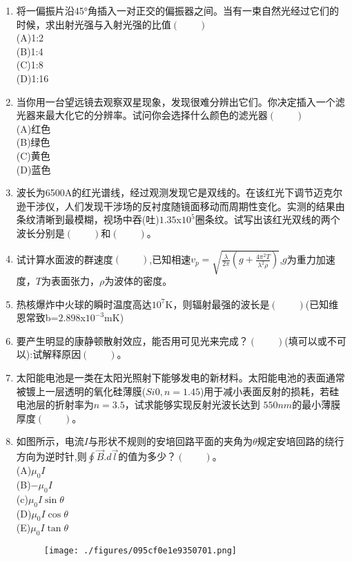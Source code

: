\begin{enumerate}
(A)白色\\
(B)红白色\\
(C)蓝白色\\
(D)彩色
\item 将一偏振片沿45°角插入一对正交的偏振器之间。当有一束自然光经过它们的时候，求出射光强与入射光强的比值$(\qquad)$\\
(A)1:2\\
(B)1:4\\
(C)1:8\\
(D)1:16
\item 当你用一台望远镜去观察双星现象，发现很难分辨出它们。你决定插入一个滤光器来最大化它的分辨率。试问你会选择什么颜色的滤光器$(\qquad)$\\
(A)红色\\
(B)绿色\\
(C)黄色\\
(D)蓝色\\
\item 波长为6500A的红光谱线，经过观测发现它是双线的。在该红光下调节迈克尔逊干涉仪，人们发现干涉场的反衬度随镜面移动而周期性变化。实测的结果由条纹清晰到最模糊，视场中吞(吐)$1.35$x$10^5$圈条纹。试写出该红光双线的两个波长分别是$(\qquad)$和$(\qquad)$。
\item 试计算水面波的群速度$(\qquad)$,已知相速$\displaystyle v_p=\sqrt{\frac{\lambda}{2\pi}(g+\frac{4\pi ^2 T}{\lambda^2 \rho})}$,$g$为重力加速度，$T$为表面张力，$\rho$为波体的密度。
\item 热核爆炸中火球的瞬时温度高达$10^7$K，则辐射最强的波长是$(\qquad)$(已知维恩常致b=$2.898$x$10^{-3}$mK)
\item 要产生明显的康静顿散射效应，能否用可见光来完成？$(\qquad)$(填可以或不可以):试解释原因$(\qquad)$。
\item 太阳能电池是一类在太阳光照射下能够发电的新材料。太阳能电池的表面通常被镀上一层透明的氧化硅薄膜($Si0,n=1.45$)用于减小表面反射的损耗，若硅电池层的折射率为$n=3.5$，试求能够实现反射光波长达到 $550nm$的最小薄膜厚度$(\qquad)$。
\item 如图所示，电流$I$与形状不规则的安培回路平面的夹角为$\theta$规定安培回路的绕行方向为逆时针,则$\oint \vec B.d\vec l$的值为多少？$(\qquad)$。\\
(A)$\mu_0 I$\\
(B)$-\mu_0 I$\\
(c)$\mu_0 I \sin \theta $\\
(D)$\mu_0 I \cos \theta$\\
(E)$\mu_0 I \tan \theta$
\begin{figure}[ht]
\centering
\texttt{[image: ./figures/095cf0e1e9350701.png]}

\end{figure}
\end{enumerate}
